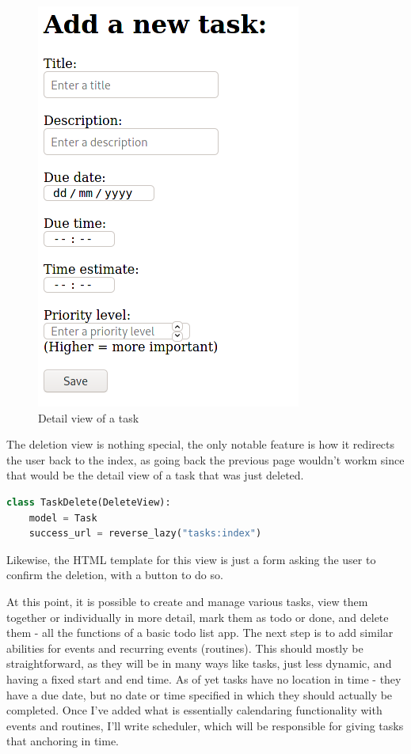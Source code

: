 \documentclass{article}
\begin{document}
\begin{figure}[H]
  \centering
  \includegraphics[width=0.5\linewidth]{Screenshots/task_form.png}
  \caption{Detail view of a task}
  \label{fig:task_form1}
\end{figure}

The deletion view is nothing special,
the only notable feature is how it redirects the user back to the index,
as going back the previous page wouldn't workm
since that would be the detail view of a task that was just deleted.

\begin{lstlisting}[language=Python, breaklines]
class TaskDelete(DeleteView):
    model = Task
    success_url = reverse_lazy("tasks:index")
\end{lstlisting}

Likewise,
the HTML template for this view is just a form asking the user to confirm the deletion,
with a button to do so.

At this point,
it is possible to create and manage various tasks,
view them together or individually in more detail,
mark them as todo or done,
and delete them -
all the functions of a basic todo list app.
The next step is to add similar abilities for events and recurring events (routines).
This should mostly be straightforward,
as they will be in many ways like tasks,
just less dynamic,
and having a fixed start and end time.
As of yet tasks have no location in time -
they have a due date,
but no date or time specified in which they should actually be completed.
Once I've added what is essentially calendaring functionality with events and routines,
I'll write scheduler,
which will be responsible for giving tasks that anchoring in time.
\end{document}
